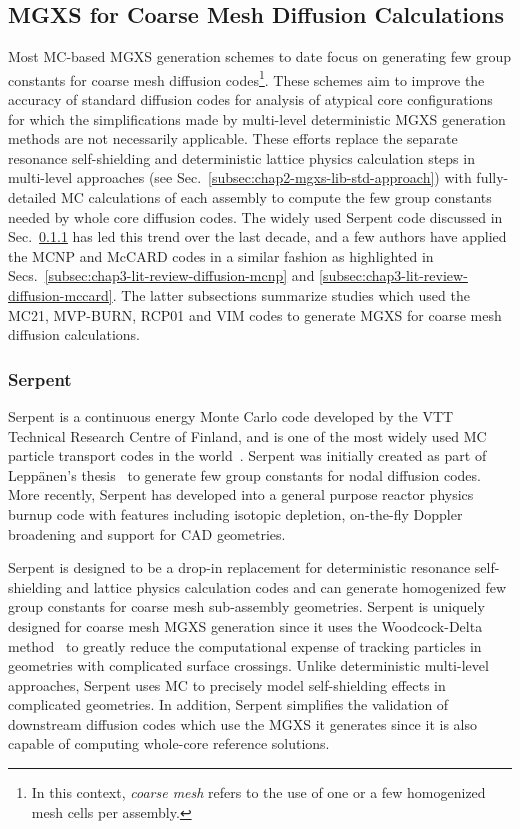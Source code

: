\subsection{MGXS for Coarse Mesh Diffusion Calculations}
\label{subsec:chap3-lit-review-diffusion}

Most \ac{MC}-based \ac{MGXS} generation schemes to date focus on generating few group constants for coarse mesh diffusion codes\footnote{In this context, \textit{coarse mesh} refers to the use of one or a few homogenized mesh cells per assembly.}. These schemes aim to improve the accuracy of standard diffusion codes for analysis of atypical core configurations for which the simplifications made by multi-level deterministic \ac{MGXS} generation methods are not necessarily applicable. These efforts replace the separate resonance self-shielding and deterministic lattice physics calculation steps in multi-level approaches (see Sec.~\ref{subsec:chap2-mgxs-lib-std-approach}) with fully-detailed \ac{MC} calculations of each assembly to compute the few group constants needed by whole core diffusion codes. The widely used Serpent code discussed in Sec.~\ref{subsec:chap3-lit-review-diffusion-serpent} has led this trend over the last decade, and a few authors have applied the MCNP and McCARD codes in a similar fashion as highlighted in Secs.~\ref{subsec:chap3-lit-review-diffusion-mcnp} and \ref{subsec:chap3-lit-review-diffusion-mccard}. The latter subsections summarize studies which used the MC21, MVP-BURN, RCP01 and VIM codes to generate \ac{MGXS} for coarse mesh diffusion calculations.

\subsubsection{Serpent}
\label{subsec:chap3-lit-review-diffusion-serpent}

Serpent is a continuous energy Monte Carlo code developed by the VTT Technical Research Centre of Finland, and is one of the most widely used \ac{MC} particle transport codes in the world~\cite{serpent2013manual}. Serpent was initially created as part of Lepp{\"a}nen's thesis~\cite{leppanen2007serpent} to generate few group constants for nodal diffusion codes. More recently, Serpent has developed into a general purpose reactor physics burnup code with features including isotopic depletion, on-the-fly Doppler broadening and support for CAD geometries.

Serpent is designed to be a drop-in replacement for deterministic resonance self-shielding and lattice physics calculation codes and can generate homogenized few group constants for coarse mesh sub-assembly geometries. Serpent is uniquely designed for coarse mesh \ac{MGXS} generation since it uses the Woodcock-Delta method~\cite{woodcock1965techniques} to greatly reduce the computational expense of tracking particles in geometries with complicated surface crossings. Unlike deterministic multi-level approaches, Serpent uses \ac{MC} to precisely model self-shielding effects in complicated geometries. In addition, Serpent simplifies the validation of downstream diffusion codes which use the \ac{MGXS} it generates since it is also capable of computing whole-core reference solutions.

